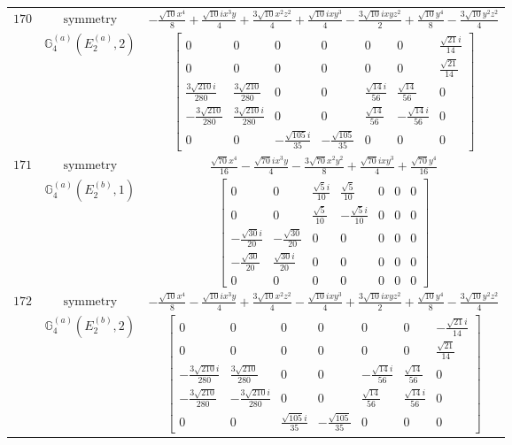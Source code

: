 \documentclass[fleqn,8pt,landscape]{jsarticle}
\begin{document}
\begin{longtable}{ccc}
$ 170 $ & $ \text{symmetry} $ & $ - \frac{\sqrt{10} x^{4}}{8} + \frac{\sqrt{10} i x^{3} y}{4} + \frac{3 \sqrt{10} x^{2} z^{2}}{4} + \frac{\sqrt{10} i x y^{3}}{4} - \frac{3 \sqrt{10} i x y z^{2}}{2} + \frac{\sqrt{10} y^{4}}{8} - \frac{3 \sqrt{10} y^{2} z^{2}}{4} $ \\
$  $ & $ \mathbb{G}_{4}^{(a)}(E_{2}^{(a)},2) $ & $ \begin{bmatrix} 0 & 0 & 0 & 0 & 0 & 0 & \frac{\sqrt{21} i}{14} \\ 0 & 0 & 0 & 0 & 0 & 0 & \frac{\sqrt{21}}{14} \\ \frac{3 \sqrt{210} i}{280} & \frac{3 \sqrt{210}}{280} & 0 & 0 & \frac{\sqrt{14} i}{56} & \frac{\sqrt{14}}{56} & 0 \\ - \frac{3 \sqrt{210}}{280} & \frac{3 \sqrt{210} i}{280} & 0 & 0 & \frac{\sqrt{14}}{56} & - \frac{\sqrt{14} i}{56} & 0 \\ 0 & 0 & - \frac{\sqrt{105} i}{35} & - \frac{\sqrt{105}}{35} & 0 & 0 & 0 \end{bmatrix} $ \\ \hline
$ 171 $ & $ \text{symmetry} $ & $ \frac{\sqrt{70} x^{4}}{16} - \frac{\sqrt{70} i x^{3} y}{4} - \frac{3 \sqrt{70} x^{2} y^{2}}{8} + \frac{\sqrt{70} i x y^{3}}{4} + \frac{\sqrt{70} y^{4}}{16} $ \\
$  $ & $ \mathbb{G}_{4}^{(a)}(E_{2}^{(b)},1) $ & $ \begin{bmatrix} 0 & 0 & \frac{\sqrt{5} i}{10} & \frac{\sqrt{5}}{10} & 0 & 0 & 0 \\ 0 & 0 & \frac{\sqrt{5}}{10} & - \frac{\sqrt{5} i}{10} & 0 & 0 & 0 \\ - \frac{\sqrt{30} i}{20} & - \frac{\sqrt{30}}{20} & 0 & 0 & 0 & 0 & 0 \\ - \frac{\sqrt{30}}{20} & \frac{\sqrt{30} i}{20} & 0 & 0 & 0 & 0 & 0 \\ 0 & 0 & 0 & 0 & 0 & 0 & 0 \end{bmatrix} $ \\ \hline
$ 172 $ & $ \text{symmetry} $ & $ - \frac{\sqrt{10} x^{4}}{8} - \frac{\sqrt{10} i x^{3} y}{4} + \frac{3 \sqrt{10} x^{2} z^{2}}{4} - \frac{\sqrt{10} i x y^{3}}{4} + \frac{3 \sqrt{10} i x y z^{2}}{2} + \frac{\sqrt{10} y^{4}}{8} - \frac{3 \sqrt{10} y^{2} z^{2}}{4} $ \\
$  $ & $ \mathbb{G}_{4}^{(a)}(E_{2}^{(b)},2) $ & $ \begin{bmatrix} 0 & 0 & 0 & 0 & 0 & 0 & - \frac{\sqrt{21} i}{14} \\ 0 & 0 & 0 & 0 & 0 & 0 & \frac{\sqrt{21}}{14} \\ - \frac{3 \sqrt{210} i}{280} & \frac{3 \sqrt{210}}{280} & 0 & 0 & - \frac{\sqrt{14} i}{56} & \frac{\sqrt{14}}{56} & 0 \\ - \frac{3 \sqrt{210}}{280} & - \frac{3 \sqrt{210} i}{280} & 0 & 0 & \frac{\sqrt{14}}{56} & \frac{\sqrt{14} i}{56} & 0 \\ 0 & 0 & \frac{\sqrt{105} i}{35} & - \frac{\sqrt{105}}{35} & 0 & 0 & 0 \end{bmatrix} $ \\ \hline

\end{longtable}
\end{document}

